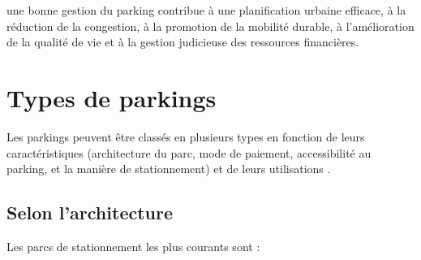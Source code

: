 une bonne gestion du parking contribue à une planification urbaine efficace, à la réduction de la congestion, à la promotion de la mobilité durable, à l'amélioration de la qualité de vie et à la gestion judicieuse des ressources financières.

\section{Types de parkings }

Les parkings peuvent être classés en plusieurs types en fonction de leurs caractéristiques (architecture du  parc, mode de paiement, accessibilité au parking, et la manière de stationnement) et de leurs utilisations \cite{evo-park}.

\subsection{Selon l'architecture  } 
Les parcs de stationnement les plus courants sont :
